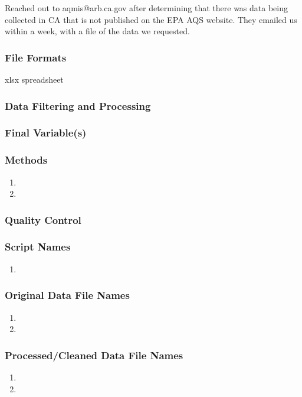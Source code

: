 Reached out to aqmis@arb.ca.gov after determining that there was data being collected in CA that is not published on the EPA AQS website. They emailed us within a week, with a file of the data we requested. 

\subsubsection*{File Formats} 
xlsx spreadsheet

\subsubsection*{Data Filtering and Processing}

\subsubsection*{Final Variable(s)}

\subsubsection*{Methods}

\begin{enumerate}
\item 
\item
\end{enumerate}

\subsubsection*{Quality Control}

\subsubsection*{Script Names}

\begin{enumerate}
\item 
\end{enumerate}

\subsubsection*{Original Data File Names}

\begin{enumerate}
\item 
\item 
\end{enumerate}

\subsubsection*{Processed/Cleaned Data File Names}

\begin{enumerate}
\item 
\item 
\end{enumerate}
